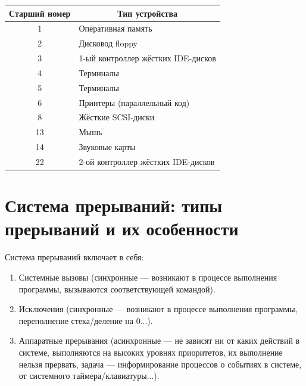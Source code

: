 \begin{table}[H]
\begin{center}
\begin{tabular}{|c|l|}
\hline
Старший номер & \multicolumn{1}{c|}{Тип устройства} \\ \hline
1             & Оперативная память                  \\ \hline
2             & Дисковод floppy                     \\ \hline
3             & 1-ый контроллер жёстких IDE-дисков  \\ \hline
4             & Терминалы                           \\ \hline
5             & Терминалы                           \\ \hline
6             & Принтеры (параллельный код)         \\ \hline
8             & Жёсткие SCSI-диски                  \\ \hline
13            & Мышь                                \\ \hline
14            & Звуковые карты                      \\ \hline
22            & 2-ой контроллер жёстких IDE-дисков  \\ \hline
\end{tabular}
\end{center}
\end{table}

\newpage

\section{Система прерываний: типы прерываний и их особенности}

Система прерываний включает в себя:
\begin{enumerate}
	\item Системные вызовы (синхронные --- возникают в процессе выполнения программы, вызываются соответствующей командой).
	\item Исключения (синхронные --- возникают в процессе выполнения программы, переполнение стека/деление на 0...).
	\item Аппаратные прерывания (асинхронные --- не зависят ни от каких действий в системе, выполняются на высоких уровнях приоритетов, их выполнение нельзя прервать, задача --- информирование процессов о событиях в системе, от системного таймера/клавиатуры...).
\end{enumerate}

